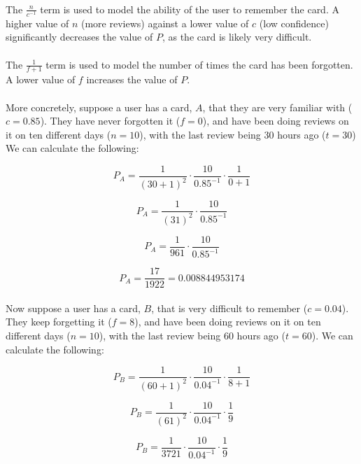 \documentclass{report}
\begin{document}
\paragraph{}
The $\frac{n}{c ^{-1}}$ term is used to model the ability of the user to remember the card. A higher value of $n$ (more reviews) against a lower value of $c$ (low confidence) significantly decreases the value of $P$, as the card is likely very difficult.

\paragraph{}
The $\frac{1}{f + 1}$ term is used to model the number of times the card has been forgotten. A lower value of $f$ increases the value of $P$.

\paragraph{}
More concretely, suppose a user has a card, $A$, that they are very familiar with ($c = 0.85$). They have never forgotten it ($f = 0$), and have been doing reviews on it on ten different days ($n = 10$), with the last review being 30 hours ago ($t = 30$) We can calculate the following:

\[
  P _ A = \frac{1}{(30 + 1) ^ 2} \cdot \frac{10}{0.85 ^ {-1}} \cdot \frac{1}{0 + 1}
\]

\[
  P _ A = \frac{1}{(31) ^ 2} \cdot \frac{10}{0.85 ^ {-1}}
\]

\[
  P _ A = \frac{1}{961} \cdot \frac{10}{0.85 ^ {-1}}
\]

\[
  P _ A = \frac{17}{1922} = 0.008844953174
\]

\paragraph{}
Now suppose a user has a card, $B$, that is very difficult to remember ($c = 0.04$).  They keep forgetting it ($f = 8$), and have been doing reviews on it on ten different days ($n = 10$), with the last review being 60 hours ago ($t = 60$). We can calculate the following:

\[
  P _ B = \frac{1}{(60 + 1) ^ 2} \cdot \frac{10}{0.04 ^ {-1}} \cdot \frac{1}{8 + 1}
\]

\[
  P _ B = \frac{1}{(61) ^ 2} \cdot \frac{10}{0.04 ^ {-1}} \cdot \frac{1}{9}
\]

\[
  P _ B = \frac{1}{3721} \cdot \frac{10}{0.04 ^ {-1}} \cdot \frac{1}{9}
\]
\end{document}
